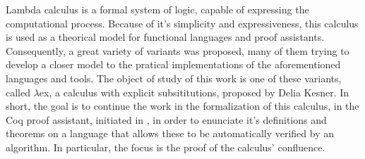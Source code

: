 Lambda calculus is a formal system of logic, capable of expressing the computational process.
Because of it's simplicity and expressiveness, this calculus is used as a theorical model
for functional languages and proof assistants. Consequently, a great variety of variants
was proposed, many of them trying to develop a closer model to the pratical implementations
of the aforementioned languages and tools.
The object of study of this work is one of these variants, called $\lambda$ex, 
a calculus with explicit subsititutions, proposed by Delia Kesner.
In short, the goal is to continue the work in the formalization of this calculus, 
in the Coq proof assistant, initiated in \cite{initial}, in order to
enunciate it's definitions and theorems on a language that allows these to be automatically
verified by an algorithm.
In particular, the focus is the proof of the calculus' confluence.
